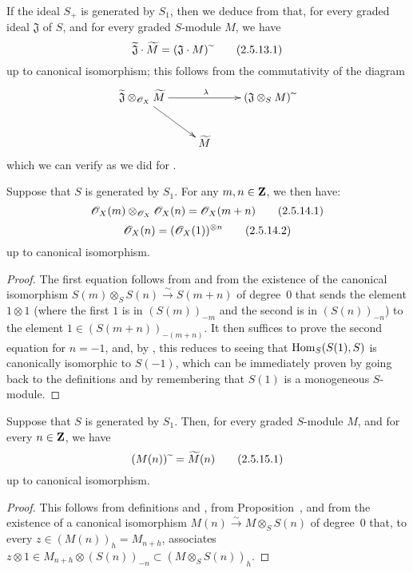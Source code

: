 If the ideal $S_+$ is generated by $S_1$, then we deduce from  that, for every graded ideal $\mathfrak{J}$ of $S$, and for every graded $S$-module $M$, we have
\[
\label{II.2.5.13.1}
  \widetilde{\mathfrak{J}}\cdot\widetilde{M} = (\mathfrak{J}\cdot M){\,\widetilde{\,}\,}
\tag{2.5.13.1}
\]
up to canonical isomorphism;
this follows from the commutativity of the diagram
\[
  \xymatrix{
    \widetilde{\mathfrak{J}}\otimes_{\sh{O}_X}\widetilde{M} \ar[rr]^\lambda \ar[dr]
    && (\mathfrak{J}\otimes_S M)\supertilde
  \\&\widetilde{M}
  }
\]
which we can verify as we did for .

\begin{corollary}[2.5.14]
\label{II.2.5.14}
Suppose that $S$ is generated by $S_1$.
For any $m,n\in\mathbf{Z}$, we then have:
\[
\label{II.2.5.14.1}
  \mathscr{O}_X(m)\otimes_{\mathscr{O}_X}\mathscr{O}_X(n) = \mathscr{O}_X(m+n)
\tag{2.5.14.1}
\]
\[
\label{II.2.5.14.2}
  \mathscr{O}_X(n) = (\mathscr{O}_X(1))^{\otimes n}
\tag{2.5.14.2}
\]
up to canonical isomorphism.
\end{corollary}

\begin{proof}
The first equation follows from  and from the existence of the canonical isomorphism $S(m)\otimes_S S(n)\xrightarrow{\sim}S(m+n)$ of degree~$0$ that sends the element $1\otimes1$ (where the first $1$ is in $(S(m))_{-m}$ and the second is in $(S(n))_{-n}$) to the element $1\in(S(m+n))_{-(m+n)}$.
It then suffices to prove the second equation for $n=-1$, and, by , this reduces to seeing that $\operatorname{Hom}_S(S(1),S)$ is canonically isomorphic to $S(-1)$, which can be immediately proven by going back to the definitions  and by remembering that $S(1)$ is a monogeneous $S$-module.
\end{proof}

\begin{corollary}[2.5.15]
\label{II.2.5.15}
Suppose that $S$ is generated by $S_1$.
Then, for every graded $S$-module $M$, and for every $n\in\mathbf{Z}$, we have
\[
\label{II.2.5.15.1}
  (M(n)){\,\widetilde{\,}\,} = \widetilde{M}(n)
\tag{2.5.15.1}
\]
up to canonical isomorphism.
\end{corollary}

\begin{proof}
This follows from definitions  and , from Proposition~, and from the existence of a canonical isomorphism $M(n)\xrightarrow{\sim}M\otimes_S S(n)$ of degree~$0$ that, to every $z\in(M(n))_h=M_{n+h}$, associates $z\otimes1\in M_{n+h}\otimes(S(n))_{-n}\subset(M\otimes_S S(n))_h$.
\end{proof}

